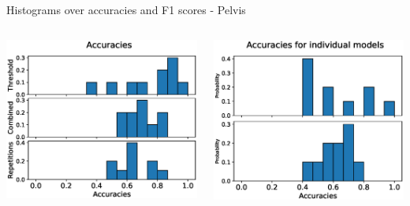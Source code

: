 \begin{frame}[fragile]{Histograms over accuracies and F1 scores - Pelvis}
  \vspace{0.2cm}
  \begin{columns}
  \includegraphics[width=\textwidth]{files/figs/res/pelvis/acc.eps}

  \includegraphics[width=\textwidth]{files/figs/res/pelvis/acc-ind.eps}


\end{columns}
\end{frame}
